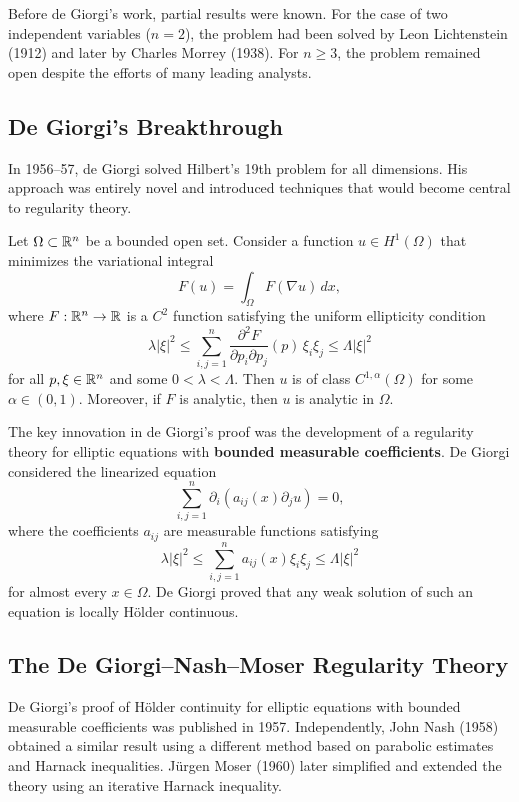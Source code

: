 Before de Giorgi's work, partial results were known. For the case of two independent variables (\(n = 2\)), the problem had been solved by Leon Lichtenstein (1912) and later by Charles Morrey (1938). For \(n \geq 3\), the problem remained open despite the efforts of many leading analysts.

\subsection{De Giorgi's Breakthrough}

In 1956--57, de Giorgi solved Hilbert's 19th problem for all dimensions. His approach was entirely novel and introduced techniques that would become central to regularity theory.

\begin{theorem}
Let \(\Omega \subset \mathbb{R}^n\) be a bounded open set. Consider a function \(u \in H^1(\Omega)\) that minimizes the variational integral
\[
F(u) = \int_\Omega F(\nabla u)\,dx,
\]
where \(F: \mathbb{R}^n \to \mathbb{R}\) is a \(C^2\) function satisfying the uniform ellipticity condition
\[
\lambda |\xi|^2 \leq \sum_{i,j=1}^n \frac{\partial^2 F}{\partial p_i \partial p_j}(p) \,\xi_i\xi_j \leq \Lambda |\xi|^2
\]
for all \(p,\xi \in \mathbb{R}^n\) and some \(0 < \lambda < \Lambda\). Then \(u\) is of class \(C^{1,\alpha}(\Omega)\) for some \(\alpha \in (0,1)\). Moreover, if \(F\) is analytic, then \(u\) is analytic in \(\Omega\).
\end{theorem}

The key innovation in de Giorgi's proof was the development of a regularity theory for elliptic equations with \textbf{bounded measurable coefficients}. De Giorgi considered the linearized equation
\[
\sum_{i,j=1}^n \partial_i (a_{ij}(x) \partial_j u) = 0,
\]
where the coefficients \(a_{ij}\) are measurable functions satisfying
\[
\lambda |\xi|^2 \leq \sum_{i,j=1}^n a_{ij}(x) \xi_i \xi_j \leq \Lambda |\xi|^2
\]
for almost every \(x \in \Omega\). De Giorgi proved that any weak solution of such an equation is locally H\"older continuous.

\subsection{The De Giorgi--Nash--Moser Regularity Theory}

De Giorgi's proof of H\"older continuity for elliptic equations with bounded measurable coefficients was published in 1957. Independently, John Nash (1958) obtained a similar result using a different method based on parabolic estimates and Harnack inequalities. J\"urgen Moser (1960) later simplified and extended the theory using an iterative Harnack inequality.

